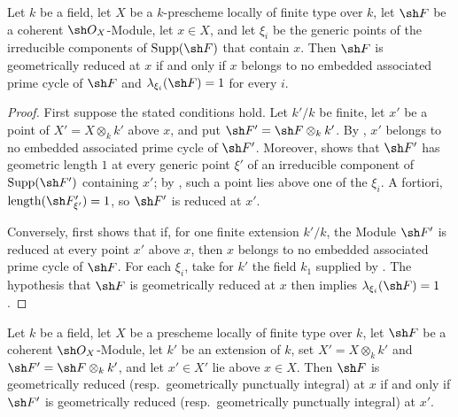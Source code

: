 
\begin{proposition}[4.7.10]
\label{IV.4.7.10}
Let $k$ be a field, let $X$ be a $k$-prescheme locally of finite type
over $k$, let $\sh F$ be a coherent $\sh O_X$-Module, let $x\in X$,
and let $\xi_i$ be the generic points of the irreducible components
of $\operatorname{Supp}(\sh F)$ that contain $x$.
Then $\sh F$ is geometrically reduced at $x$
 if and only if $x$ belongs to no embedded associated
prime cycle of $\sh F$ and
$\lambda_{\xi_i}(\sh F)=1$ for every $i$.
\end{proposition}

\begin{proof}
First suppose the stated conditions hold.
Let $k'/k$ be finite, let $x'$ be a point of
$X'=X\otimes_k k'$ above $x$, and put
$\sh F'=\sh F\otimes_k k'$.
By , $x'$ belongs to no embedded associated prime cycle
of $\sh F'$.
Moreover,  shows that $\sh F'$ has geometric length
$1$ at every generic point $\xi'$ of an irreducible component of
$\operatorname{Supp}(\sh F')$ containing $x'$; by
, such a point lies above one of the $\xi_i$.
A fortiori,
$\operatorname{length}(\sh F'_{\xi'})=1$, so $\sh F'$ is reduced at
$x'$.

Conversely,  first shows that if, for one finite
extension $k'/k$, the Module $\sh F'$ is reduced at every point $x'$
above $x$, then $x$ belongs to no embedded associated prime cycle of
$\sh F$.
For each $\xi_i$, take for $k'$ the field $k_1$ supplied by
.
The hypothesis that $\sh F$ is geometrically reduced at $x$ then
implies $\lambda_{\xi_i}(\sh F)=1$.
\end{proof}

\begin{proposition}[4.7.11]
\label{IV.4.7.11}
Let $k$ be a field, let $X$ be a prescheme locally of finite type
over $k$, let $\sh F$ be a coherent $\sh O_X$-Module, let $k'$ be an
extension of $k$, set $X'=X\otimes_k k'$ and
$\sh F'=\sh F\otimes_k k'$, and let $x'\in X'$ lie above $x\in X$.
Then $\sh F$ is geometrically reduced
(resp.\ geometrically punctually integral) at $x$ if and only if
$\sh F'$ is geometrically reduced
(resp.\ geometrically punctually integral) at $x'$.
\end{proposition}

